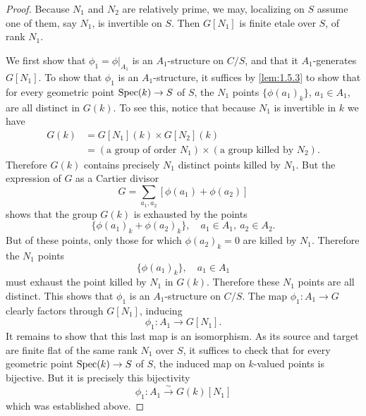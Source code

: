 \begin{proof}
Because $N_1$ and $N_2$ are relatively prime, we may, localizing on $S$ assume one of them, say $N_1$, is invertible on $S$. Then $G[N_1]$ is finite etale over $S$, of rank $N_1$.

We first show that $\phi_1 = \phi|_{A_1}$ is an $A_1$-structure on $C/S$, and that it $A_1$-generates $G[N_1]$. To show that $\phi_1$ is an $A_1$-structure, it suffices by \ref{lem:1.5.3} to show that for every geometric point $\operatorname{Spec}(k) \to S$ of $S$, the $N_1$ points $\{\phi(a_1)_k\}$, $a_1 \in A_1$, are all distinct in $G(k)$. To see this, notice that because $N_1$ is invertible in $k$ we have
\begin{align*}
G(k) &= G[N_1](k) \times G[N_2](k) \\
&= (\text{a group of order } N_1) \times (\text{a group killed by } N_2).
\end{align*}
Therefore $G(k)$ contains precisely $N_1$ distinct points killed by $N_1$. But the expression of $G$ as a Cartier divisor
\[
G = \sum_{a_1, a_2} [\phi(a_1) + \phi(a_2)]
\]
shows that the group $G(k)$ is exhausted by the points
\[
\{\phi(a_1)_k + \phi(a_2)_k\}, \quad a_1 \in A_1, \ a_2 \in A_2.
\]
But of these points, only those for which $\phi(a_2)_k = 0$ are killed by $N_1$. Therefore the $N_1$ points
\[
\{\phi(a_1)_k\}, \quad a_1 \in A_1
\]
must exhaust the point killed by $N_1$ in $G(k)$. Therefore these $N_1$ points are all distinct. This shows that $\phi_1$ is an $A_1$-structure on $C/S$. The map $\phi_1 : A_1 \to G$ clearly factors through $G[N_1]$, inducing
\[
\phi_1 : A_1 \to G[N_1].
\]
It remains to show that this last map is an isomorphism. As its source and target are finite flat of the same rank $N_1$ over $S$, it suffices to check that for every geometric point $\operatorname{Spec}(k) \to S$ of $S$, the induced map on $k$-valued points is bijective. But it is precisely this bijectivity
\[
\phi_1 : A_1 \xrightarrow{\ \sim\ } G(k)[N_1]
\]
which was established above.


\end{proof}
